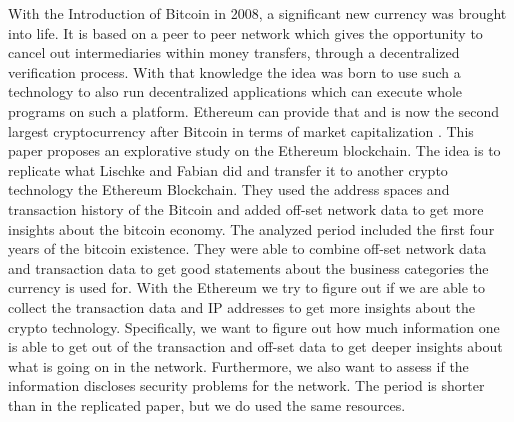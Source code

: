 With the Introduction of Bitcoin in 2008, a significant new currency was brought into life.
It is based on a peer to peer network which gives the opportunity to cancel out intermediaries within money transfers, through a decentralized verification process. 
With that knowledge the idea was born to use such a technology to also run decentralized applications which can execute whole programs on such a platform. 
Ethereum can provide that and is now the second largest cryptocurrency after Bitcoin in terms of market capitalization \cite{BitInfoEther, BitInfoBitcoin}.
This paper proposes an explorative study on the Ethereum blockchain. 
The idea is to replicate what Lischke and Fabian \cite{lischke2016analyzing} did and transfer it to another crypto technology the Ethereum Blockchain. 
They used the address spaces and transaction history of the Bitcoin and added off-set network data to get more insights about the bitcoin economy. 
The analyzed period included the first four years of the bitcoin existence. They were able to combine off-set network data and transaction data to get good statements about the business categories the currency is used for. 
With the Ethereum we try to figure out if we are able to collect the transaction data and IP addresses to get more insights about the crypto technology. Specifically, we want to figure out how much information one is able to get out of the transaction and off-set data to get deeper insights about what is going on in the network. Furthermore, we also want to assess if the information discloses security problems for the network. 
The period is shorter than in the replicated paper, but we do used the same resources.

